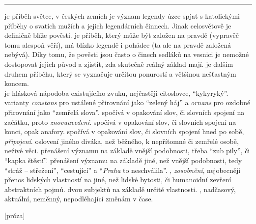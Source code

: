 \documentclass{extarticle} %
\begin{document}
\noindent\begin{minipage}{\textwidth}
    {\textcolor{\wpagecolor}{\rule{\linewidth}{0.4pt}}
    \changefontsize{7pt}
    \footnotesize
     je příběh světce, v českých zemích je význam legendy úzce spjat s katolickými příběhy o svatích mužích a jejich legendárních činnech. Jinak celosvětově je definičně blíže pověsti.
     je příběh, který může být založen na pravdě (vypravěč tomu alespoň věří), má blízko legendě i pohádce (ta ale na pravdě založená nebývá). Díky tomu, že pověsti jsou často o činech sedláků na vesnici je nemožné dostopovat jejich původ a zjistit, zda skutečně reálný základ mají.
     je dalším druhem příběhu, který se vyznačuje určitou ponurostí a většinou nešťastným koncem. \\
     je hlásková nápodoba existujícího zvuku, nejčastěji citoslovce, \enquote{kykyryký}.
     varianty \textit{constans} pro ustálené přirovnání jako \enquote{zelený háj} a \textit{ornans} pro ozdobné přirovnání jako \enquote{zemřelá slova}.
     spočívá v opakování slov, či slovních spojení na začátku, proto \textit{znovuuvedení}.
     spočívá v opakování slov, či slovních spojení na konci, opak anafory.
     spočívá v opakování slov, či slovních spojení hned po sobě, \textit{připojení}.
     oslovení jiného diváka, než běžného, k nepřítomné či zemřelé osobě, neživé věci.
     přenášení významu na základě vnější podobnosti, třeba \enquote{zub pily}, či \enquote{kapka štěstí}.
     přenášení významu na základě jiné, než vnější podobnosti, tedy \enquote{stráž -- střežení}, \enquote{cestující} a \enquote{\textit{Praha} to neschválila}.
    , \textit{zosobnění}, nejobecněji přenos lidských vlastností na jiné, než lidské bytosti, či humanoidní zevření abstraktních pojmů.
     dvou subjektů na základě určité vlastnosti.
    , nadčasový, aktuální, neměnný, nepodléhající změnám v čase.
    }
\end{minipage}

\newpage


\changefontsize{8pt}

[próza]
\end{document}

